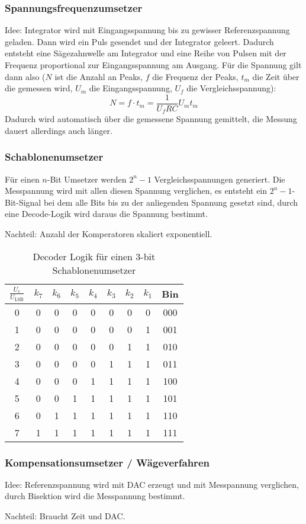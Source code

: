 \subsubsection{Spannungsfrequenzumsetzer}
Idee: Integrator wird mit Eingangsspannung bis zu gewisser Referenzspannung geladen. Dann wird ein Puls gesendet und der Integrator geleert.
Dadurch entsteht eine Sägezahnwelle am Integrator und eine Reihe von Pulsen mit der Frequenz proportional zur Eingangsspannung am Ausgang.
Für die Spannung gilt dann also ($N$ ist die Anzahl an Peaks, $f$ die Frequenz der Peaks, $t_m$ die Zeit über die gemessen wird, $U_m$ die Eingangsspannung,
$U_f$ die Vergleichsspannung):
\begin{equation*}
    N = f \cdot t_m = \frac{1}{U_f R C} U_m t_m
\end{equation*}
Dadurch wird automatisch über die gemessene Spannung gemittelt, die Messung dauert allerdings auch länger.

\subsubsection{Schablonenumsetzer}
Für einen $n$-Bit Umsetzer werden $2^n -1$ Vergleichsspannungen generiert.
Die Messpannung wird mit allen diesen Spannung verglichen, es entsteht ein $2^n-1$-Bit-Signal bei dem alle Bits bis zu der anliegenden Spannung gesetzt sind,
durch eine Decode-Logik wird daraus die Spannung bestimmt.

Nachteil: Anzahl der Komperatoren skaliert exponentiell.

\begin{table}[H]
    \centering
    \begin{tabular}{c|ccccccc|c}
        \toprule
        $\frac{U_e}{U_\text{LSB}}$ & $k_7$ & $k_6$ & $k_5$ & $k_4$ & $k_3$ & $k_2$ & $k_1$ & Bin \\
        \midrule
        0 & 0 & 0 & 0 & 0 & 0 & 0 & 0 & 000\\
        1 & 0 & 0 & 0 & 0 & 0 & 0 & 1 & 001\\
        2 & 0 & 0 & 0 & 0 & 0 & 1 & 1 & 010\\
        3 & 0 & 0 & 0 & 0 & 1 & 1 & 1 & 011\\
        4 & 0 & 0 & 0 & 1 & 1 & 1 & 1 & 100\\
        5 & 0 & 0 & 1 & 1 & 1 & 1 & 1 & 101\\
        6 & 0 & 1 & 1 & 1 & 1 & 1 & 1 & 110\\
        7 & 1 & 1 & 1 & 1 & 1 & 1 & 1 & 111\\
        \bottomrule
    \end{tabular}
    \caption{Decoder Logik für einen 3-bit Schablonenumsetzer}
\end{table}

\subsubsection{Kompensationsumsetzer / Wägeverfahren}
Idee: Referenzspannung wird mit DAC erzeugt und mit Messpannung verglichen, durch Bisektion wird die Messpannung bestimmt.

Nachteil: Braucht Zeit und DAC.
